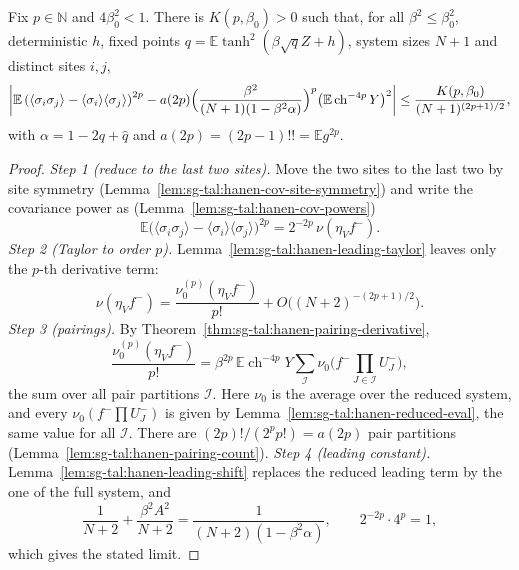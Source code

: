\begin{theorem}\label{thm:sg-tal:hanen-even}
\leanok
{}
Fix $p\in\mathbb N$ and $4\beta_0^2<1$. There is $K(p,\beta_0)>0$ such that, for all $\beta^2\le\beta_0^2$, deterministic $h$,
fixed points $q=\mathbb E\tanh^2(\beta\sqrt q Z+h)$, system sizes $N+1$ and distinct sites $i,j$,
\[
\left|\mathbb E\left(\langle\sigma_i\sigma_j\rangle-\langle\sigma_i\rangle\langle\sigma_j\rangle\right)^{2p}
 -a(2p)\Bigl(\frac{\beta^2}{(N+1)(1-\beta^2\alpha)}\Bigr)^p\bigl(\mathbb E\operatorname{ch}^{-4p}Y\bigr)^2\right|
\le\frac{K(p,\beta_0)}{(N+1)^{(2p+1)/2}},
\]
with $\alpha=1-2q+\hat q$ and $a(2p)=(2p-1)!!=\mathbb E g^{2p}$.
\end{theorem}
\begin{proof}
\leanok
\emph{Step 1 (reduce to the last two sites).} Move the two sites to the last two by site symmetry (Lemma~\ref{lem:sg-tal:hanen-cov-site-symmetry}) and write the covariance power as (Lemma~\ref{lem:sg-tal:hanen-cov-powers})
\[
\mathbb E\big(\langle\sigma_i\sigma_j\rangle-\langle\sigma_i\rangle\langle\sigma_j\rangle\big)^{2p}=2^{-2p}\,\nu(\eta_Vf^-).
\]
\emph{Step 2 (Taylor to order $p$).} Lemma~\ref{lem:sg-tal:hanen-leading-taylor} leaves only the $p$-th derivative term:
\[
\nu(\eta_Vf^-)=\frac{\nu_0^{(p)}(\eta_Vf^-)}{p!}+O\big((N+2)^{-(2p+1)/2}\big).
\]
\emph{Step 3 (pairings).} By Theorem~\ref{thm:sg-tal:hanen-pairing-derivative},
\[
\frac{\nu_0^{(p)}(\eta_Vf^-)}{p!}=\beta^{2p}\,\mathbb E\operatorname{ch}^{-4p}Y\sum_{\mathcal I}\nu_0\Big(f^-\prod_{J\in\mathcal I}U_J^-\Big),
\]
the sum over all pair partitions $\mathcal I$. Here $\nu_0$ is the average over the reduced system, and every $\nu_0(f^-\prod U_J^-)$ is given by Lemma~\ref{lem:sg-tal:hanen-reduced-eval}, the same value for all $\mathcal I$. There are $(2p)!/(2^pp!)=a(2p)$ pair partitions (Lemma~\ref{lem:sg-tal:hanen-pairing-count}).
\emph{Step 4 (leading constant).} Lemma~\ref{lem:sg-tal:hanen-leading-shift} replaces the reduced leading term by the one of the full system, and
\[
\frac1{N+2}+\frac{\beta^2A^2}{N+2}=\frac1{(N+2)(1-\beta^2\alpha)},\qquad 2^{-2p}\cdot4^p=1,
\]
which gives the stated limit.
\end{proof}

